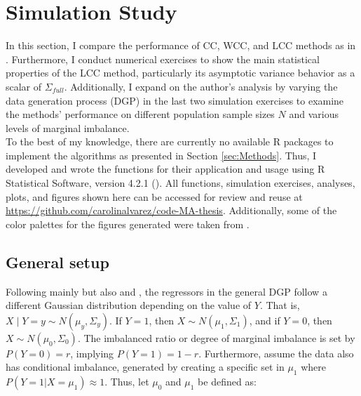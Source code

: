 \section{Simulation Study}
\label{sec:sim_study}



In this section, I compare the performance of CC, WCC, and LCC methods as in \textcite{hastie2014}. Furthermore, I conduct numerical exercises to show the main statistical properties of the LCC method, particularly its asymptotic variance behavior as a scalar of $\Sigma_{full}$. Additionally, I expand on the author's analysis by varying the data generation process (DGP) in the last two simulation exercises to examine the methods' performance on different population sample sizes $N$ and various levels of marginal imbalance.\\

To the best of my knowledge, there are currently no available R packages to implement the algorithms as presented in Section \ref{sec:Methods}. Thus, I developed and wrote the functions for their application and usage using R Statistical Software, version 4.2.1 (\cite{R}). All functions, simulation exercises, analyses, plots, and figures shown here can be accessed for review and reuse at \href{https://github.com/carolinalvarez/code-MA-thesis}{https://github.com/carolinalvarez/code-MA-thesis}. Additionally, some of the color palettes for the figures generated were taken from \textcite{wesanderson}.

\subsection{General setup}
\label{sec:sim_general}

Following mainly \textcite{hastie2014} but also \textcite{wang2020rare} and \textcite{han2020local}, the regressors in the general DGP follow a different Gaussian distribution depending on the value of $Y$. That is, $X \mid Y=y \sim N\left(\mu_y, \Sigma_y\right)$. If $Y=1$, then $X \sim N\left(\mu_1, \Sigma_1\right)$, and if $Y=0$, then $X \sim N\left(\mu_0, \Sigma_0\right)$. The imbalanced ratio or degree of marginal imbalance is set by $P(Y=0) = r$, implying $P(Y=1) = 1-r$. Furthermore, assume the data also has conditional imbalance, generated by creating a specific set in $\mu_1$ where $P(Y=1 | X = \mu_1) \approx 1$. Thus, let $\mu_0$ and $\mu_1$ be defined as:


